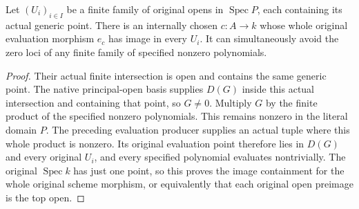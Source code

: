 \begin{lemma}
\label{lem:kn-nadel-bertini-rational-finite-opens}
\leanok
Let $(U_i)_{i\in I}$ be a finite family of original opens in
$\operatorname{Spec}P$, each containing its actual generic point.  There is
an internally chosen $c:A\to k$ whose whole original evaluation morphism
$e_c$ has image in every $U_i$.  It can simultaneously avoid the zero loci
of any finite family of specified nonzero polynomials.
\end{lemma}
\begin{proof}
Their actual finite intersection is open and contains the same generic
point.  The native principal-open basis supplies $D(G)$ inside this actual
intersection and containing that point, so $G\ne0$.  Multiply $G$ by the
finite product of the specified nonzero polynomials.  This remains nonzero
in the literal domain $P$.  The preceding evaluation producer supplies an
actual tuple where this whole product is nonzero.  Its original evaluation
point therefore lies in $D(G)$ and every original $U_i$, and every specified
polynomial evaluates nontrivially.  The original $\operatorname{Spec}k$
has just one point, so this proves the image containment for the whole
original scheme morphism, or equivalently that each original open preimage
is the top open.
\end{proof}

